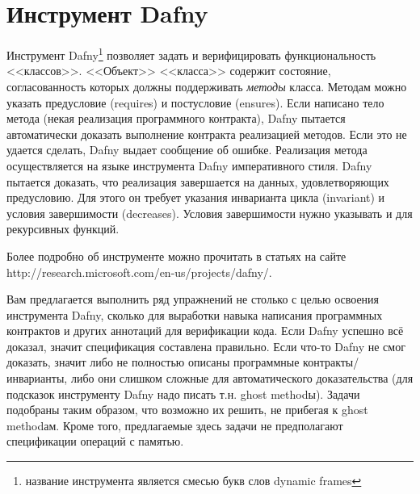 \documentclass[14pt, twoside]{extreport}
\begin{document}
%
%

\chapter{Инструмент Dafny}

Инструмент Dafny\footnote{название инструмента является смесью букв слов dynamic frames} позволяет задать и верифицировать функциональность <<классов>>. <<Объект>> <<класса>> содержит состояние, согласованность которых должны поддерживать \emph{методы} класса. Методам можно указать предусловие (requires) и постусловие (ensures). Если написано тело метода (некая реализация программного контракта), Dafny пытается автоматически доказать выполнение контракта реализацией методов. Если это не удается сделать, Dafny выдает сообщение об ошибке. Реализация метода осуществляется на языке инструмента Dafny императивного стиля. Dafny пытается доказать, что реализация завершается на данных, удовлетворяющих предусловию. Для этого он требует указания инварианта цикла (invariant) и условия завершимости (decreases). Условия завершимости нужно указывать и для рекурсивных функций.

Более подробно об инструменте можно прочитать в статьях на сайте http://research.microsoft.com/en-us/projects/dafny/.

Вам предлагается выполнить ряд упражнений не столько с целью освоения инструмента Dafny, сколько для выработки навыка написания программных контрактов и других аннотаций для верификации кода. Если Dafny успешно всё доказал, значит спецификация составлена правильно. Если что-то Dafny не смог доказать, значит либо не полностью описаны программные контракты/инварианты, либо они слишком сложные для автоматического доказательства (для подсказок инструменту Dafny надо писать т.н. ghost methodы). Задачи подобраны таким образом, что возможно их решить, не прибегая к ghost methodам. Кроме того, предлагаемые здесь задачи не предполагают спецификации операций с памятью.
\end{document}
